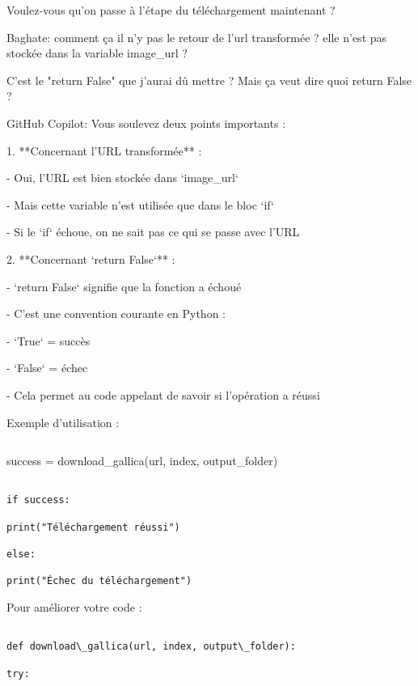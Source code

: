 Voulez-vous qu'on passe à l'étape du téléchargement maintenant ?

Baghate: comment ça il n'y pas le retour de l'url transformée ? elle n'est pas stockée dans la variable image\_url ?

C'est le "return False" que j'aurai dû mettre ? Mais ça veut dire quoi return False ?

GitHub Copilot: Vous soulevez deux points importants :

1. **Concernant l'URL transformée** :

- Oui, l'URL est bien stockée dans `image\_url`

- Mais cette variable n'est utilisée que dans le bloc `if`

- Si le `if` échoue, on ne sait pas ce qui se passe avec l'URL

2. **Concernant `return False`** :

- `return False` signifie que la fonction a échoué

- C'est une convention courante en Python :

- `True` = succès

- `False` = échec

- Cela permet au code appelant de savoir si l'opération a réussi

Exemple d'utilisation :

\begin{verbatim}

\end{verbatim}

success = download\_gallica(url, index, output\_folder)

\begin{verbatim}

if success:

print("Téléchargement réussi")

else:

print("Échec du téléchargement")

\end{verbatim}

Pour améliorer votre code :

\begin{verbatim}

def download\_gallica(url, index, output\_folder):

try:

\end{verbatim}

